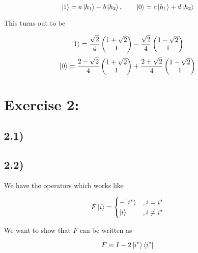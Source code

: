 \documentclass[a4paper,norsk, 10pt]{article}
\begin{document}
\begin{equation}
\ket{1} = a\ket{h_1} + b\ket{h_2}, \qquad \ket{0} = c\ket{h_1} + d\ket{h_2}
\end{equation}

This turns out to be

\begin{equation}
\ket{1} = \frac{\sqrt{2}}{4}
\begin{pmatrix}
1 + \sqrt{2} \\ 1
\end{pmatrix}
-\frac{\sqrt{2}}{4}
\begin{pmatrix}
1 - \sqrt{2} \\ 1
\end{pmatrix}
\end{equation}
\begin{equation}
\ket{0} = \frac{2-\sqrt{2}}{4}
\begin{pmatrix}
1 + \sqrt{2} \\ 1
\end{pmatrix}
+\frac{2+\sqrt{2}}{4}
\begin{pmatrix}
1 - \sqrt{2} \\ 1
\end{pmatrix}
\end{equation}

\section{Exercise 2:}

\subsection{2.1)}


\subsection{2.2)}

We have the operators which works like

\begin{equation}
F\ket{i} = 
\begin{cases}
-\ket{i^*} & , i = i^* \\
\ket{i} & , i \neq i^*
\end{cases}
\end{equation}\label{eq:Feffect}

We want to show that $F$ can be written as

\begin{equation}
F = I - 2\ket{i^*}\bra{i^*}
\end{equation}\label{eq:Foperator}
\end{document}
